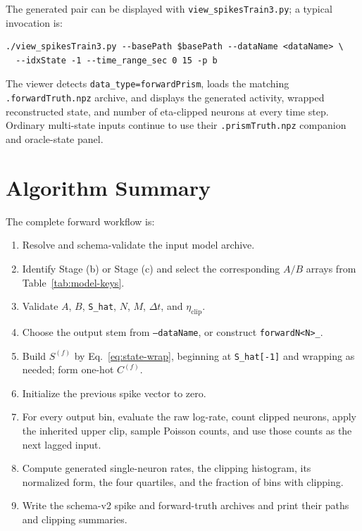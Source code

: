 \documentclass[11pt]{article}
\begin{document}
The generated pair can be displayed with
\texttt{view\_spikesTrain3.py}; a typical invocation is:
\begin{verbatim}
./view_spikesTrain3.py --basePath $basePath --dataName <dataName> \
  --idxState -1 --time_range_sec 0 15 -p b
\end{verbatim}
The viewer detects \texttt{data\_type=forwardPrism}, loads the matching
\texttt{.forwardTruth.npz} archive, and displays the generated activity,
wrapped reconstructed state, and number of eta-clipped neurons at every
time step. Ordinary multi-state inputs continue to use their
\texttt{.prismTruth.npz} companion and oracle-state panel.

\section{Algorithm Summary}
\label{sec:summary}

The complete forward workflow is:
\begin{enumerate}
  \item Resolve and schema-validate the input model archive.
  \item Identify Stage (b) or Stage (c) and select the corresponding
        \(A/B\) arrays from Table~\ref{tab:model-keys}.
  \item Validate \(A\), \(B\), \texttt{S\_hat}, \(N\), \(M\),
        \(\Delta t\), and \(\eta_{\mathrm{clip}}\).
  \item Choose the output stem from \texttt{--dataName}, or construct
        \texttt{forwardN<N>\_<hash6>}.
  \item Build \(S^{(f)}\) by Eq.~\eqref{eq:state-wrap}, beginning at
        \texttt{S\_hat[-1]} and wrapping as needed; form one-hot
        \(C^{(f)}\).
  \item Initialize the previous spike vector to zero.
  \item For every output bin, evaluate the raw log-rate, count clipped
        neurons, apply the inherited upper clip, sample Poisson counts, and
        use those counts as the next lagged input.
  \item Compute generated single-neuron rates, the clipping histogram, its
        normalized form, the four quartiles, and the fraction of bins with
        clipping.
  \item Write the schema-v2 spike and forward-truth archives and print their
        paths and clipping summaries.
\end{enumerate}
\end{document}
